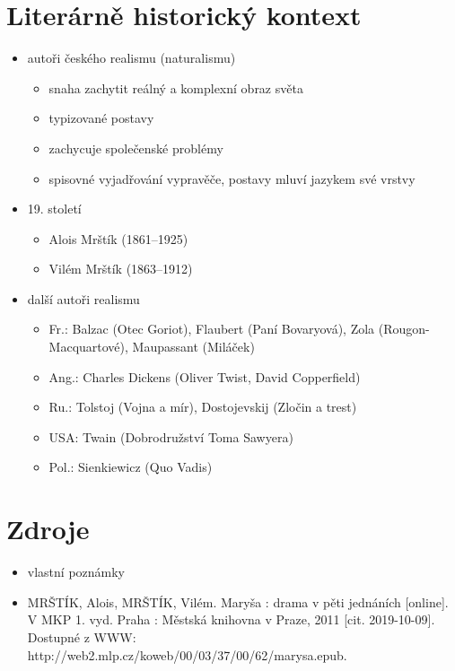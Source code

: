 \documentclass[10pt,a4paper]{article}
\begin{document}
\section*{Literárně historický kontext}
\begin{itemize}
\item autoři českého realismu (naturalismu)
	\begin{itemize}
	\item snaha zachytit reálný a komplexní obraz světa
	\item typizované postavy
	\item zachycuje společenské problémy
	\item spisovné vyjadřování vypravěče, postavy mluví jazykem své vrstvy
	\end{itemize}
\item 19. století 
	\begin{itemize}
	\item Alois Mrštík (1861--1925)
	\item Vilém Mrštík (1863--1912)
	\end{itemize}
\item další autoři realismu
	\begin{itemize}
	\item Fr.: Balzac (Otec Goriot), Flaubert (Paní Bovaryová), Zola (Rougon-Macquartové), Maupassant (Miláček)
	\item Ang.: Charles Dickens (Oliver Twist, David Copperfield)
	\item Ru.: Tolstoj (Vojna a mír), Dostojevskij (Zločin a trest)
	\item USA: Twain (Dobrodružství Toma Sawyera)
	\item Pol.: Sienkiewicz (Quo Vadis)
	\end{itemize}
\end{itemize}
\section*{Zdroje}
\begin{itemize}
\item vlastní poznámky
\item MRŠTÍK, Alois, MRŠTÍK, Vilém. Maryša : drama v pěti jednáních [online]. V MKP 1. vyd. Praha : Městská knihovna v Praze, 2011 [cit. 2019-10-09]. Dostupné z WWW: \\ http://web2.mlp.cz/koweb/00/03/37/00/62/marysa.epub.
\end{itemize}


\end{document}
